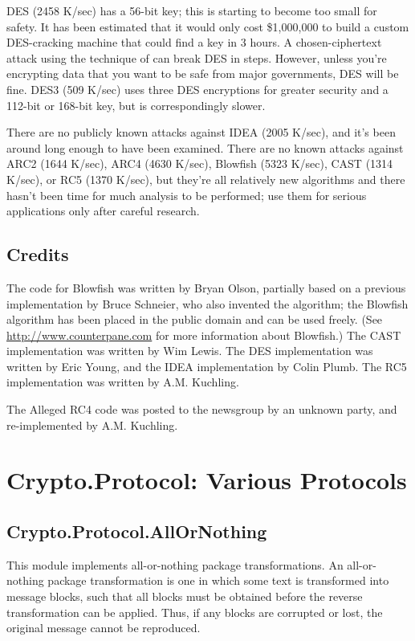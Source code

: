 \documentclass{howto}
\begin{document}
DES (2458 K/sec) has a 56-bit key; this is starting to become too small
for safety.  It has been estimated that it would only cost \$1,000,000 to
build a custom DES-cracking machine that could find a key in 3 hours.  A
chosen-ciphertext attack using the technique of  can break DES in  steps.  However,
unless you're encrypting data that you want to be safe from major
governments, DES will be fine. DES3 (509 K/sec) uses three DES
encryptions for greater security and a 112-bit or 168-bit key, but is
correspondingly slower.

There are no publicly known attacks against IDEA (2005 K/sec), and
it's been around long enough to have been examined.  There are no
known attacks against ARC2 (1644 K/sec), ARC4 (4630 K/sec), Blowfish
(5323 K/sec), CAST (1314 K/sec), or RC5 (1370
K/sec), but they're all relatively new
algorithms and there hasn't been time for much analysis to be
performed; use them for serious applications only after careful
research.  


\subsection{Credits}
The code for Blowfish was written by Bryan Olson, partially based on a
previous implementation by Bruce Schneier, who also invented the
algorithm; the Blowfish algorithm has been placed in the public domain
and can be used freely.  (See \url{http://www.counterpane.com} for more
information about Blowfish.)  The CAST implementation was written by 
Wim Lewis.  The DES implementation was written by Eric Young, and the
IDEA implementation by Colin Plumb. The RC5 implementation
was written by A.M. Kuchling.

The Alleged RC4 code was posted to the  newsgroup by an
unknown party, and re-implemented by A.M. Kuchling.  

\section{Crypto.Protocol: Various Protocols}

\subsection{Crypto.Protocol.AllOrNothing}

This module implements all-or-nothing package transformations.
An all-or-nothing package transformation is one in which some text is
transformed into message blocks, such that all blocks must be obtained before
the reverse transformation can be applied.  Thus, if any blocks are corrupted
or lost, the original message cannot be reproduced.
\end{document}
